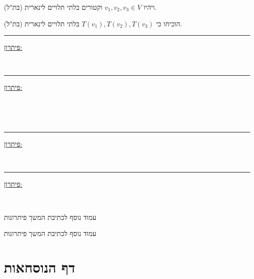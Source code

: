 \documentclass[12pt, a4paper]{article}
\begin{document}
\begin{enumerate}
{\begin{enumerate}
ויהיו
$v_1,v_2,v_3\in V$
וקטורים בלתי תלויים לינארית (בת"ל).

הוכיחו כי
$T(v_1),T(v_2),T(v_3)$
בלתי תלויים לינארית (בת"ל).
\end{enumerate}

}\forthQ
\pagebreak
\setcounter{enumi}{0}
    \firstQ
\noindent\rule{\textwidth-30pt}{0.4pt}
\underline{פיתרון:}
    
    \pagebreak \ 
    \ 
    
    \pagebreak

    
    \secondQ
    \noindent\rule{\textwidth-30pt}{0.4pt}
    \underline{פיתרון:}


    \pagebreak \ \pagebreak \ 

    \ 
    
    \pagebreak

    \thirdQ
    \noindent\rule{\textwidth-30pt}{0.4pt}
    \underline{פיתרון:}


    \pagebreak \ \pagebreak

    \forthQ
    \noindent\rule{\textwidth-30pt}{0.4pt}
    \underline{פיתרון:}


    \pagebreak \ \pagebreak
\end{enumerate}

    \pagebreak 
    
    עמוד נוסף לכתיבת המשך פיתרונות
    
    \pagebreak
    עמוד נוסף לכתיבת המשך פיתרונות

 \pagebreak


\section*{דף הנוסחאות}
\end{document}

